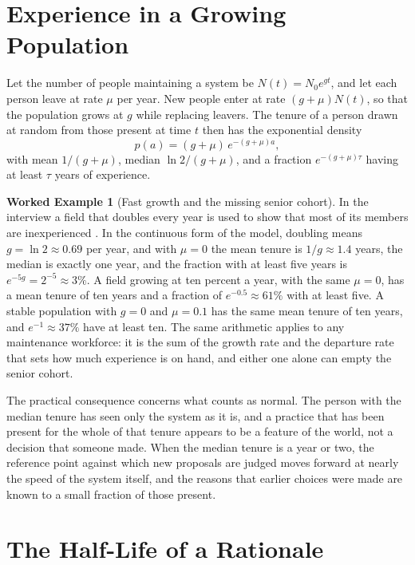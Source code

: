 \documentclass[11pt,openany]{book}
\theoremstyle{definition}
\newtheorem{example}{Worked Example}[chapter]
\theoremstyle{remark}
\begin{document}
\section{Experience in a Growing Population}

Let the number of people maintaining a system be $N(t)=N_0e^{gt}$, and let each person leave at rate $\mu$ per year. New people enter at rate $(g+\mu)N(t)$, so that the population grows at $g$ while replacing leavers. The tenure of a person drawn at random from those present at time $t$ then has the exponential density
\begin{equation}
p(a)=(g+\mu)\,e^{-(g+\mu)a},
\label{eq:tenure}
\end{equation}
with mean $1/(g+\mu)$, median $\ln2/(g+\mu)$, and a fraction $e^{-(g+\mu)\tau}$ having at least $\tau$ years of experience.

\begin{example}[Fast growth and the missing senior cohort]
\label{ex:cohort}
In the interview a field that doubles every year is used to show that most of its members are inexperienced \cite{blow2026}. In the continuous form of the model, doubling means $g=\ln2\approx0.69$ per year, and with $\mu=0$ the mean tenure is $1/g\approx1.4$ years, the median is exactly one year, and the fraction with at least five years is $e^{-5g}=2^{-5}\approx3\%$. A field growing at ten percent a year, with the same $\mu=0$, has a mean tenure of ten years and a fraction of $e^{-0.5}\approx61\%$ with at least five. A stable population with $g=0$ and $\mu=0.1$ has the same mean tenure of ten years, and $e^{-1}\approx37\%$ have at least ten. The same arithmetic applies to any maintenance workforce: it is the sum of the growth rate and the departure rate that sets how much experience is on hand, and either one alone can empty the senior cohort.
\end{example}

The practical consequence concerns what counts as normal. The person with the median tenure has seen only the system as it is, and a practice that has been present for the whole of that tenure appears to be a feature of the world, not a decision that someone made. When the median tenure is a year or two, the reference point against which new proposals are judged moves forward at nearly the speed of the system itself, and the reasons that earlier choices were made are known to a small fraction of those present.

\section{The Half-Life of a Rationale}
\end{document}
